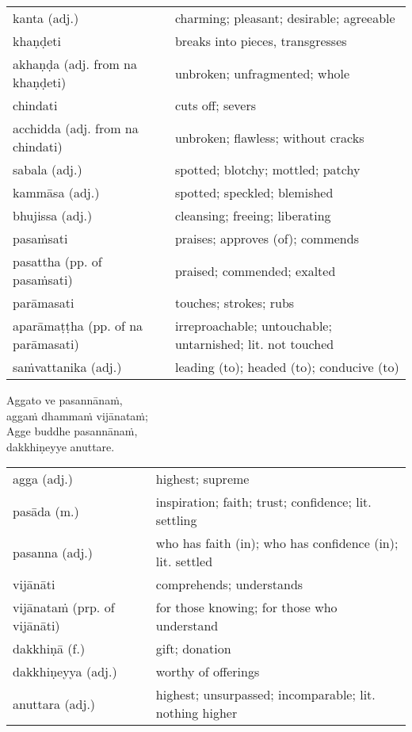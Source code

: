 \documentclass[11pt,oneside]{memoir}
\begin{document}
\begin{longtable}{L{\colOne} L{\colTwo}}
kanta (adj.) & charming; pleasant; desirable; agreeable\\[0pt]
khaṇḍeti & breaks into pieces, transgresses\\[0pt]
akhaṇḍa (adj. from na khaṇḍeti) & unbroken; unfragmented; whole\\[0pt]
chindati & cuts off; severs\\[0pt]
acchidda (adj. from na chindati) & unbroken; flawless; without cracks\\[0pt]
sabala (adj.) & spotted; blotchy; mottled; patchy\\[0pt]
kammāsa (adj.) & spotted; speckled; blemished\\[0pt]
bhujissa (adj.) & cleansing; freeing; liberating\\[0pt]
pasaṁsati & praises; approves (of); commends\\[0pt]
pasattha (pp. of pasaṁsati) & praised; commended; exalted\\[0pt]
parāmasati & touches; strokes; rubs\\[0pt]
aparāmaṭṭha (pp. of na parāmasati) & irreproachable; untouchable; untarnished; lit. not touched\\[0pt]
saṁvattanika (adj.) & leading (to); headed (to); conducive (to)\\[0pt]
\end{longtable}

\begin{spacedquote}
Aggato ve pasannānaṁ, \\[0pt]
aggaṁ dhammaṁ vijānataṁ; \\[0pt]
Agge buddhe pasannānaṁ, \\[0pt]
dakkhiṇeyye anuttare.
\end{spacedquote}

\begin{longtable}{L{\colOne} L{\colTwo}}
agga (adj.) & highest; supreme\\[0pt]
pasāda (m.) & inspiration; faith; trust; confidence; lit. settling\\[0pt]
pasanna (adj.) & who has faith (in); who has confidence (in); lit. settled\\[0pt]
vijānāti & comprehends; understands\\[0pt]
vijānataṁ (prp. of vijānāti) & for those knowing; for those who understand\\[0pt]
dakkhiṇā (f.) & gift; donation\\[0pt]
dakkhiṇeyya (adj.) & worthy of offerings\\[0pt]
anuttara (adj.) & highest; unsurpassed; incomparable; lit. nothing higher\\[0pt]
\end{longtable}
\end{document}
